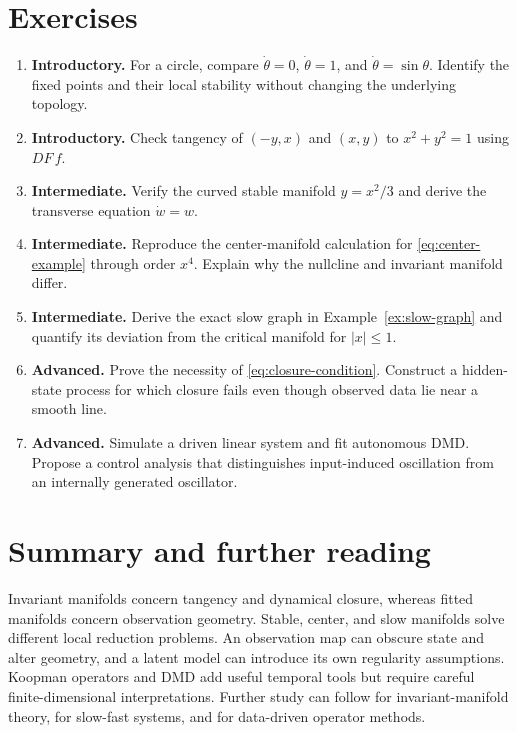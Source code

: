 \section{Exercises}
\begin{enumerate}
\item \textbf{Introductory.} For a circle, compare $\dot\theta=0$, $\dot\theta=1$, and $\dot\theta=\sin\theta$. Identify the fixed points and their local stability without changing the underlying topology.
\item \textbf{Introductory.} Check tangency of $(-y,x)$ and $(x,y)$ to $x^2+y^2=1$ using $DF\,f$.
\item \textbf{Intermediate.} Verify the curved stable manifold $y=x^2/3$ and derive the transverse equation $\dot w=w$.
\item \textbf{Intermediate.} Reproduce the center-manifold calculation for \eqref{eq:center-example} through order $x^4$. Explain why the nullcline and invariant manifold differ.
\item \textbf{Intermediate.} Derive the exact slow graph in Example~\ref{ex:slow-graph} and quantify its deviation from the critical manifold for $|x|\leq1$.
\item \textbf{Advanced.} Prove the necessity of \eqref{eq:closure-condition}. Construct a hidden-state process for which closure fails even though observed data lie near a smooth line.
\item \textbf{Advanced.} Simulate a driven linear system and fit autonomous DMD. Propose a control analysis that distinguishes input-induced oscillation from an internally generated oscillator.
\end{enumerate}

\section{Summary and further reading}
Invariant manifolds concern tangency and dynamical closure, whereas fitted manifolds concern observation geometry. Stable, center, and slow manifolds solve different local reduction problems. An observation map can obscure state and alter geometry, and a latent model can introduce its own regularity assumptions. Koopman operators and DMD add useful temporal tools but require careful finite-dimensional interpretations. Further study can follow \citet{teschl2012} for invariant-manifold theory, \citet{fenichel1979} for slow-fast systems, and \citet{schmid2010,brunton2016koopman} for data-driven operator methods.
